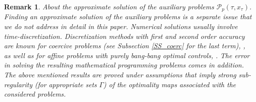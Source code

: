 \documentclass[11pt]{article}
\newtheorem{rem}[theo]{Remark}
\newcommand{\p}{{\mathcal P}}
\begin{document}
\begin{rem} \label{R_approx} About the approximate solution of the auxiliary problems $\p_{p}(\tau, x_\tau)$.
{\em Finding an approximate solution of the auxiliary problems is a separate issue that we do not address in detail in this paper.
Numerical solutions usually involve time-discretization. Discretization methods with first and second order accuracy
are known for coercive problems (see Subsection \ref{SS_coerc} for the last term), \cite{Dont-96,Dont+Hager+Veliov:RK}, 
as well as for affine problems with purely bang-bang optimal controls, \cite{WAlt+UF+MS-18,P+S+Veliov-17}. 
The error in solving the resulting mathematical programming problems comes in addition.
The above mentioned results are proved under assumptions that imply strong sub-regularity 
(for appropriate sets $\Gamma$) of the optimality maps associated with the considered problems.  
}\end{rem}
\end{document}
